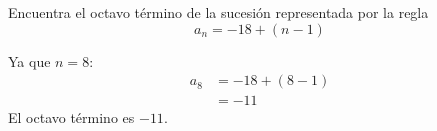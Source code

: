 Encuentra el octavo término de la sucesión representada por la regla
\[a_n=-18+(n-1)\]

\begin{solutionbox}{3cm}
    Ya que $n=8$:
    \begin{align*}
        a_8 & =-18+(8-1) \\
            & =-11
    \end{align*}
    El octavo término es $-11$.
\end{solutionbox}
